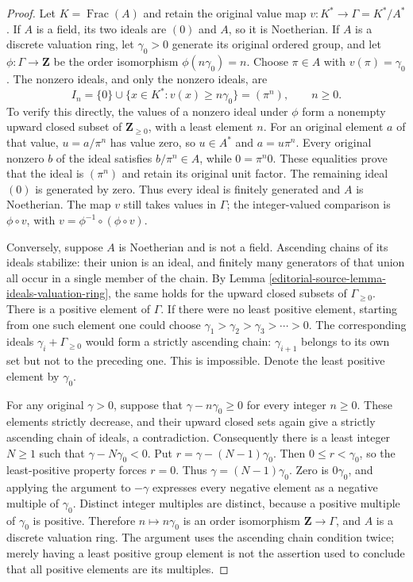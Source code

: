 \begin{proof}
Let $K=\operatorname{Frac}(A)$ and retain the original value map
$v:K^*\to\Gamma=K^*/A^*$. If $A$ is a field, its two ideals
are $(0)$ and $A$, so it is Noetherian.
If $A$ is a discrete valuation ring, let $\gamma_0>0$ generate
its original ordered group, and let
$\phi:\Gamma\to\mathbf Z$ be the order isomorphism
$\phi(n\gamma_0)=n$. Choose $\pi\in A$ with
$v(\pi)=\gamma_0$. The nonzero ideals, and only the nonzero
ideals, are
$$
I_n=\{0\}\cup\{x\in K^*:v(x)\geq n\gamma_0\}
=(\pi^n),\qquad n\geq0.
$$
To verify this directly, the values of a nonzero ideal under
$\phi$ form a nonempty upward closed subset of
$\mathbf Z_{\geq0}$, with a least element $n$.
For an original element $a$ of that value,
$u=a/\pi^n$ has value zero, so $u\in A^*$ and
$a=u\pi^n$. Every original nonzero $b$ of the ideal satisfies
$b/\pi^n\in A$, while $0=\pi^n0$. These equalities prove
that the ideal is $(\pi^n)$ and retain its original unit factor.
The remaining ideal $(0)$ is generated by zero. Thus every ideal
is finitely generated and $A$ is Noetherian. The map $v$ still
takes values in $\Gamma$; the integer-valued comparison is
$\phi\circ v$, with $v=\phi^{-1}\circ(\phi\circ v)$.

Conversely, suppose $A$ is Noetherian and is not a field.
Ascending chains of its ideals stabilize: their union is an ideal,
and finitely many generators of that union all occur in a single
member of the chain. By Lemma \ref{editorial-source-lemma-ideals-valuation-ring},
the same holds for the upward closed subsets of
$\Gamma_{\geq0}$. There is a positive element of $\Gamma$.
If there were no least positive element, starting from one such
element one could choose
$\gamma_1>\gamma_2>\gamma_3>\cdots>0$.
The corresponding ideals
$\gamma_i+\Gamma_{\geq0}$ would form a strictly ascending
chain: $\gamma_{i+1}$ belongs to its own set but not to the
preceding one. This is impossible. Denote the least positive
element by $\gamma_0$.

For any original $\gamma>0$, suppose that
$\gamma-n\gamma_0\geq0$ for every integer $n\geq0$.
These elements strictly decrease, and their upward closed sets
again give a strictly ascending chain of ideals, a contradiction.
Consequently there is a least integer $N\geq1$ such that
$\gamma-N\gamma_0<0$. Put
$r=\gamma-(N-1)\gamma_0$. Then
$0\leq r<\gamma_0$, so the least-positive property forces
$r=0$. Thus $\gamma=(N-1)\gamma_0$.
Zero is $0\gamma_0$, and applying the argument to $-\gamma$
expresses every negative element as a negative multiple of
$\gamma_0$. Distinct integer multiples are distinct, because
a positive multiple of $\gamma_0$ is positive. Therefore
$n\mapsto n\gamma_0$ is an order isomorphism
$\mathbf Z\to\Gamma$, and $A$ is a discrete valuation ring.
The argument uses the ascending chain condition twice; merely
having a least positive group element is not the assertion used
to conclude that all positive elements are its multiples.
\end{proof}























